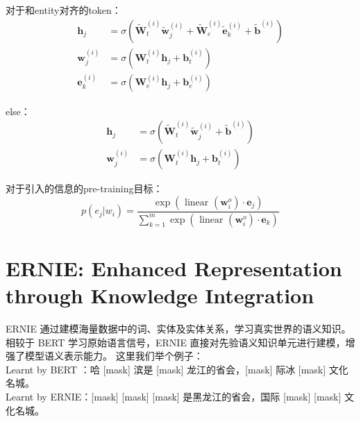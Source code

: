 \documentclass[a4paper,UTF8]{article}
\numberwithin{equation}{section}
\begin{document}
对于和entity对齐的token：
\begin{equation}
\begin{aligned} \boldsymbol{h}_{j} &=\sigma\left(\tilde{\boldsymbol{W}}_{t}^{(i)} \tilde{\boldsymbol{w}}_{j}^{(i)}+\tilde{\boldsymbol{W}}_{e}^{(i)} \tilde{\boldsymbol{e}}_{k}^{(i)}+\tilde{\boldsymbol{b}}^{(i)}\right) \\ \boldsymbol{w}_{j}^{(i)} &=\sigma\left(\boldsymbol{W}_{t}^{(i)} \boldsymbol{h}_{j}+\boldsymbol{b}_{t}^{(i)}\right) \\ \boldsymbol{e}_{k}^{(i)} &=\sigma\left(\boldsymbol{W}_{e}^{(i)} \boldsymbol{h}_{j}+\boldsymbol{b}_{e}^{(i)}\right) \end{aligned}
\end{equation}

else：
\begin{equation}
\begin{aligned} \boldsymbol{h}_{j} &=\sigma\left(\tilde{\boldsymbol{W}}_{t}^{(i)} \tilde{\boldsymbol{w}}_{j}^{(i)}+\tilde{\boldsymbol{b}}^{(i)}\right) \\ \boldsymbol{w}_{j}^{(i)} &=\sigma\left(\boldsymbol{W}_{t}^{(i)} \boldsymbol{h}_{j}+\boldsymbol{b}_{t}^{(i)}\right) \end{aligned}
\end{equation}

对于引入的信息的pre-training目标：
\begin{equation}
	p\left(e_{j} | w_{i}\right)=\frac{\exp \left(\text { linear }\left(\boldsymbol{w}_{i}^{o}\right) \cdot \boldsymbol{e}_{j}\right)}{\sum_{k=1}^{m} \exp \left(\text { linear }\left(\boldsymbol{w}_{i}^{o}\right) \cdot \boldsymbol{e}_{k}\right)}
	\end{equation}

\newpage
\section{ERNIE: Enhanced Representation through Knowledge Integration}
ERNIE 通过建模海量数据中的词、实体及实体关系，学习真实世界的语义知识。相较于 BERT 学习原始语言信号，ERNIE 直接对先验语义知识单元进行建模，增强了模型语义表示能力。
这里我们举个例子：\\

Learnt by BERT ：哈 [mask] 滨是 [mask] 龙江的省会，[mask] 际冰 [mask] 文化名城。\\

Learnt by ERNIE：[mask] [mask] [mask] 是黑龙江的省会，国际 [mask] [mask] 文化名城。\\
\end{document}
